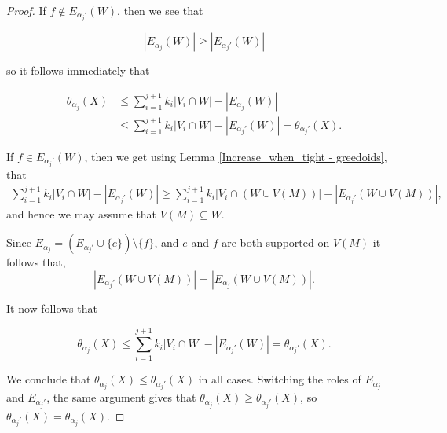 \documentclass[10pt,a4paper]{article}
\begin{document}
\begin{proof}
 If $f \notin E_{\alpha_j'}(W)$, then we see that

 \[|E_{\alpha_j}(W)| \geq |E_{\alpha_j'}(W)|\]

so it follows immediately that 

\begin{align*}
    \theta_{\alpha_j}(X) &\leq  \sum_{i=1}^{j+1} k_i |V_i \cap W| - |E_{\alpha_{j}}(W)| \\
    &\leq \sum_{i=1}^{j+1} k_i |V_i \cap W| - |E_{\alpha_{j}'}(W)| = \theta_{\alpha_j'}(X).
\end{align*}
 
 If $f \in E_{\alpha_j'}(W)$, then we get using Lemma \ref{Increase_when_tight - greedoids}, that
\begin{align*}
\sum_{i=1}^{j+1} k_i |V_i\cap W| - |E_{\alpha_j'}(W)|  \geq \sum_{i=1}^{j+1} k_i |V_i\cap (W\cup V(M))| - |E_{\alpha_{j}'}(W \cup V(M))|,
\end{align*}
and hence we may assume that $V(M) \subseteq W$.

Since $E_{\alpha_{j}} = \left (E_{\alpha_{j}'} \cup \{e\}\right) \setminus \{f\}$, and $e$ and $f$ are both supported on $V(M)$ it follows that,
$$|E_{\alpha_{j}'}(W\cup V(M))|=|E_{\alpha_{j}}(W\cup V(M))|.$$

It now follows that

$$\theta_{\alpha_j}(X) \leq  \sum_{i=1}^{j+1} k_i |V_i \cap W| - |E_{\alpha_{j}'}(W)| = \theta_{\alpha_j'}(X).$$


We conclude that $\theta_{\alpha_j}(X)\leq \theta_{\alpha_j'}(X)$ in all cases. Switching the roles of $E_{\alpha_j}$ and $E_{\alpha_j'}$, the same argument gives that $\theta_{\alpha_j}(X) \geq \theta_{\alpha_j'}(X)$, so $\theta_{\alpha_j'}(X) = \theta_{\alpha_j}(X)$. 
\end{proof}
\end{document}
